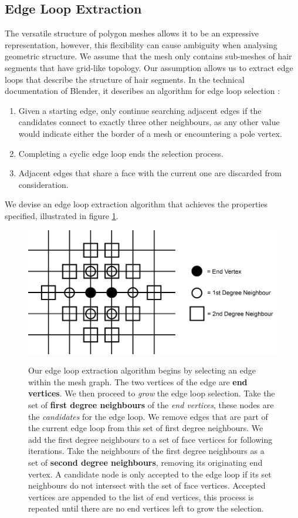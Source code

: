 \documentclass[ %
author={Dillon Keith Diep},
supervisor={Dr. Carl Henrik Ek},
degree={MEng},
title={ART-CG Hair:},
subtitle={Assisted Real-time Content Generation of Stylised Virtual Hair},
type={Research},
year={2017} ]{dissertation}
\begin{document}
\subsection{Edge Loop Extraction}
The versatile structure of polygon meshes allows it to be an expressive representation, however, this flexibility can cause ambiguity when analysing geometric structure. We assume that the mesh only contains sub-meshes of hair segments that have grid-like topology. Our assumption allows us to extract edge loops that describe the structure of hair segments. In the technical documentation of Blender, it describes an algorithm for edge loop selection \cite{blenderedgeloop}:
\begin{enumerate}
\item Given a starting edge, only continue searching adjacent edges if the candidates connect to exactly three other neighbours, as any other value would indicate either the border of a mesh or encountering a pole vertex.
\item Completing a cyclic edge loop ends the selection process.
\item Adjacent edges that share a face with the current one are discarded from consideration.
\end{enumerate}
We devise an edge loop extraction algorithm that achieves the properties specified, illustrated in figure \ref{edgeLoopFig}.

\begin{figure}[!h]
	\centering
	\caption{Our edge loop extraction algorithm begins by selecting an edge within the mesh graph. The two vertices of the edge are \textbf{end vertices}. We then proceed to \textit{grow} the edge loop selection. Take the set of \textbf{first degree neighbours} of the \textit{end vertices}, these nodes are the \textit{candidates} for the edge loop. We remove edges that are part of the current edge loop from this set of first degree neighbours. We add the first degree neighbours to a set of face vertices for following iterations. Take the neighbours of the first degree neighbours as a set of \textbf{second degree neighbours}, removing its originating end vertex. A candidate node is only accepted to the edge loop if its set neighbours do not intersect with the set of face vertices. Accepted vertices are appended to the list of end vertices, this process is repeated until there are no end vertices left to grow the selection.}
	\includegraphics[scale=0.35]{images/edgeLoopDiagram}\\
	
	\label{edgeLoopFig}
\end{figure}
\end{document}
